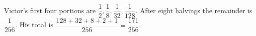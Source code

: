 Victor's first four portions are $\dfrac{1}{2},\dfrac{1}{8},\dfrac{1}{32},\dfrac{1}{128}$. After eight halvings the remainder is $\dfrac{1}{256}$. His total is $\dfrac{128+32+8+2+1}{256}=\boxed{\dfrac{171}{256}}$.
